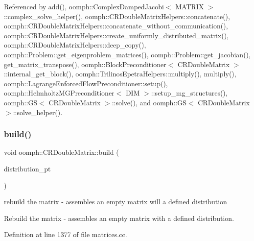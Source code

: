 Referenced by add(), oomph\+::\+Complex\+Damped\+Jacobi$<$ M\+A\+T\+R\+I\+X $>$\+::complex\+\_\+solve\+\_\+helper(), oomph\+::\+C\+R\+Double\+Matrix\+Helpers\+::concatenate(), oomph\+::\+C\+R\+Double\+Matrix\+Helpers\+::concatenate\+\_\+without\+\_\+communication(), oomph\+::\+C\+R\+Double\+Matrix\+Helpers\+::create\+\_\+uniformly\+\_\+distributed\+\_\+matrix(), oomph\+::\+C\+R\+Double\+Matrix\+Helpers\+::deep\+\_\+copy(), oomph\+::\+Problem\+::get\+\_\+eigenproblem\+\_\+matrices(), oomph\+::\+Problem\+::get\+\_\+jacobian(), get\+\_\+matrix\+\_\+transpose(), oomph\+::\+Block\+Preconditioner$<$ C\+R\+Double\+Matrix $>$\+::internal\+\_\+get\+\_\+block(), oomph\+::\+Trilinos\+Epetra\+Helpers\+::multiply(), multiply(), oomph\+::\+Lagrange\+Enforced\+Flow\+Preconditioner\+::setup(), oomph\+::\+Helmholtz\+M\+G\+Preconditioner$<$ D\+I\+M $>$\+::setup\+\_\+mg\+\_\+structures(), oomph\+::\+G\+S$<$ C\+R\+Double\+Matrix $>$\+::solve(), and oomph\+::\+G\+S$<$ C\+R\+Double\+Matrix $>$\+::solve\+\_\+helper().

\mbox{\label{classoomph_1_1CRDoubleMatrix_a7fc397b91a7289df8ee64287ae20e132}} 
\subsubsection{\texorpdfstring{build()}{build()}\hspace{0.1cm}{\footnotesize\ttfamily [2/3]}}
{\footnotesize\ttfamily void oomph\+::\+C\+R\+Double\+Matrix\+::build (\begin{DoxyParamCaption}\item[{const \hyperlink{classoomph_1_1LinearAlgebraDistribution}{Linear\+Algebra\+Distribution} $\ast$}]{distribution\+\_\+pt }\end{DoxyParamCaption})}



rebuild the matrix -\/ assembles an empty matrix will a defined distribution 

Rebuild the matrix -\/ assembles an empty matrix with a defined distribution. 

Definition at line 1377 of file matrices.\+cc.

\mbox{\label{classoomph_1_1CRDoubleMatrix_ac04c0787a123256b3dbaf6acf40df4e2}} 
